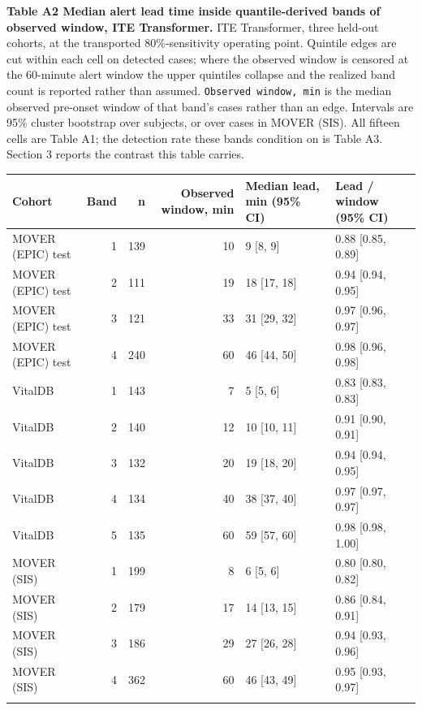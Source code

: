 \begin{minipage}{\linewidth}
\textbf{Table A2 \textbar{} Median alert lead time inside quantile-derived bands of observed window, ITE Transformer.} ITE
Transformer, three held-out cohorts, at the transported 80\%-sensitivity operating point.
Quintile edges are cut within each cell on detected cases; where the observed window is censored
at the 60-minute alert window the upper quintiles collapse and the realized band count is
reported rather than assumed. \texttt{Observed\ window,\ min} is the median observed pre-onset window of that band's cases rather than
an edge. Intervals are 95\% cluster bootstrap over subjects, or over cases in MOVER (SIS). All fifteen cells are Table A1; the detection rate these bands condition on is Table A3.
Section 3 reports the contrast this table carries.

\vspace{0.5em}
\centering\footnotesize
\begin{tabular}{@{}lrrrll@{}}
\toprule\noalign{}
Cohort & Band & n & Observed window, min & Median lead, min (95\% CI) & Lead / window (95\% CI) \\
\midrule\noalign{}
\bottomrule\noalign{}
MOVER (EPIC) test & 1 & 139 & 10 & 9 {[}8, 9{]} & 0.88 {[}0.85, 0.89{]} \\
MOVER (EPIC) test & 2 & 111 & 19 & 18 {[}17, 18{]} & 0.94 {[}0.94, 0.95{]} \\
MOVER (EPIC) test & 3 & 121 & 33 & 31 {[}29, 32{]} & 0.97 {[}0.96, 0.97{]} \\
MOVER (EPIC) test & 4 & 240 & 60 & 46 {[}44, 50{]} & 0.98 {[}0.96, 0.98{]} \\
VitalDB & 1 & 143 & 7 & 5 {[}5, 6{]} & 0.83 {[}0.83, 0.83{]} \\
VitalDB & 2 & 140 & 12 & 10 {[}10, 11{]} & 0.91 {[}0.90, 0.91{]} \\
VitalDB & 3 & 132 & 20 & 19 {[}18, 20{]} & 0.94 {[}0.94, 0.95{]} \\
VitalDB & 4 & 134 & 40 & 38 {[}37, 40{]} & 0.97 {[}0.97, 0.97{]} \\
VitalDB & 5 & 135 & 60 & 59 {[}57, 60{]} & 0.98 {[}0.98, 1.00{]} \\
MOVER (SIS) & 1 & 199 & 8 & 6 {[}5, 6{]} & 0.80 {[}0.80, 0.82{]} \\
MOVER (SIS) & 2 & 179 & 17 & 14 {[}13, 15{]} & 0.86 {[}0.84, 0.91{]} \\
MOVER (SIS) & 3 & 186 & 29 & 27 {[}26, 28{]} & 0.94 {[}0.93, 0.96{]} \\
MOVER (SIS) & 4 & 362 & 60 & 46 {[}43, 49{]} & 0.95 {[}0.93, 0.97{]} \\
\bottomrule\noalign{}
\end{tabular}
\end{minipage}

